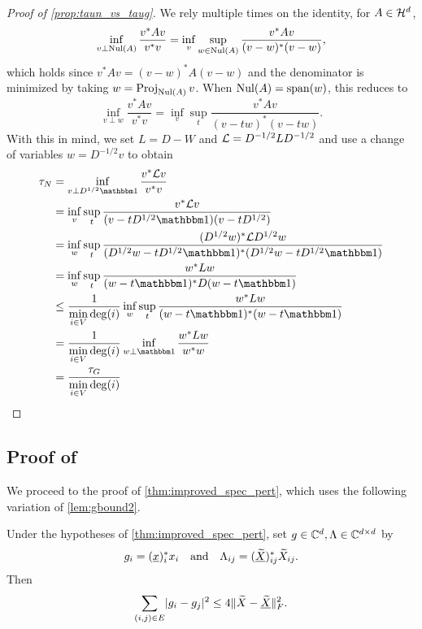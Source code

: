 \begin{proof}[Proof of \cref{prop:taun_vs_taug}]
  We rely multiple times on the identity, for $A \in \mathcal{H}^d$, \[\inf_{v \perp \operatorname{Nul}(A)} \dfrac{v^* A v}{v^* v} = \inf_v \sup_{w \in \operatorname{Nul}(A)} \dfrac{v^* A v}{(v - w)^*(v - w)},\] which holds since $v^* A v = (v - w)^* A (v - w)$ and the denominator is minimized by taking $w = \operatorname{Proj}_{\operatorname{Nul}(A)} v$.  When $\operatorname{Nul}(A) = \operatorname{span}(w)$, this reduces to \[\inf_{v \perp w} \dfrac{v^* A v}{v^* v} = \inf_v \sup_t \dfrac{v^* A v}{(v - t w)^* (v - t w)}.\]  With this in mind, we set $L = D - W$ and $\mathcal{L} = D^{-1/2} L D^{-1/2}$ and use a change of variables $w = D^{-1 / 2} v$ to obtain
  \begin{align*}
    \tau_N &= \inf_{v \perp D^{1 / 2} \one} \dfrac{v^* \Lc v}{v^* v} \\
    &= \inf_v \sup_t \dfrac{v^* \Lc v}{(v - t D^{1 / 2} \one)(v - t D^{1 /2})} \\
    &= \inf_w \sup_t \dfrac{(D^{1 / 2} w)^* \Lc D^{1 / 2} w}{(D^{1 / 2} w - t D^{1 / 2} \one)^* (D^{1 / 2} w - t D^{1 / 2} \one)} \\
    &= \inf_w \sup_t \dfrac{w^* L w}{(w - t \one)^* D (w - t \one)} \\
    &\le \dfrac{1}{\min\limits_{i \in V} \deg(i)} \inf_w \sup_t \dfrac{w^* L w}{(w - t \one)^* (w - t \one)} \\
    &= \dfrac{1}{\min\limits_{i \in V} \deg(i)} \inf_{w \perp \one} \dfrac{w^* L w}{w^* w} \\
    &= \dfrac{\tau_G}{\min\limits_{i \in V} \deg(i)}
  \end{align*}
\end{proof}


\subsection{Proof of }
We proceed to the proof of \cref{thm:improved_spec_pert}, which uses the following variation of \cref{lem:gbound2}.

\begin{lemma} \label{lem:gi_improved}
  Under the hypotheses of \cref{thm:improved_spec_pert}, set $g \in \mathbb{C}^d, \Lambda \in \mathbb{C}^{d \times d}$ by \[g_i = (\underline{x})^*_i x_i \quad \text{and} \quad \Lambda_{ij} = (\underline{\widetilde{X}})^*_{ij} \widetilde{X}_{ij}.\]  Then \[ \sum_{(i, j) \in E} \lvert g_i - g_j\rvert^2 \le 4 \lVert\widetilde{X} - \underline{\widetilde{X}}\rVert_F^2.\]
\end{lemma}

